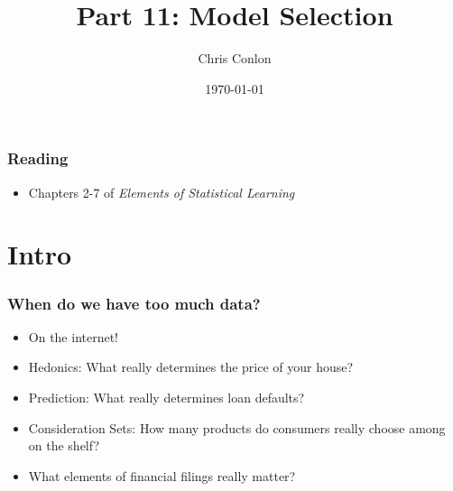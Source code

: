 \documentclass[xcolor=pdftex,dvipsnames,table,mathserif]{beamer}
\begin{document}
\title{Part 11: Model Selection}
\author{Chris Conlon}
\date{\today}

\frame{\titlepage}


\begin{frame}
\frametitle{Reading}
\begin{itemize}
\item Chapters 2-7 of \textit{Elements of Statistical Learning}
\end{itemize}

\end{frame}



\section{Intro}


\begin{frame}
\frametitle{When do we have too much data?}
\begin{itemize}
\item On the internet!
\item Hedonics: What really determines the price of your house?
\item Prediction: What really determines loan defaults?
\item Consideration Sets: How many products do consumers really choose among on the shelf?
\item What elements of financial filings really matter?
\end{itemize}

\end{frame}
\end{document}
